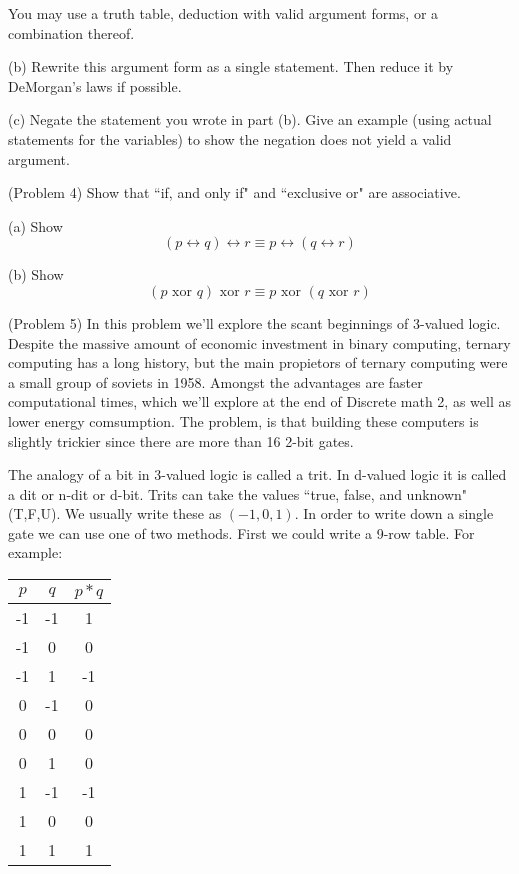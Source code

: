\documentclass[16 pt]{amsart}
\theoremstyle{definition}
\theoremstyle{remark}
\numberwithin{equation}{subsection}
\begin{document}
You may use a truth table, deduction with valid argument forms, or a combination thereof.\\

\vspace{1in}

(b) Rewrite this argument form as a single statement. Then reduce it by DeMorgan's laws if possible.

\vspace{.5in}

(c) Negate the statement you wrote in part (b).  Give an example (using actual statements for the variables) to show the negation does not yield a valid argument.

\newpage

(Problem 4) Show that ``if, and only if" and ``exclusive or" are associative.

(a) Show 
\[
(p\leftrightarrow q)\leftrightarrow r \equiv p\leftrightarrow (q \leftrightarrow r)
\]


(b) Show
\[
(p \text{ xor } q) \text{ xor } r \equiv p \text{ xor } (q \text{ xor } r)
\]

\newpage

(Problem 5) In this problem we'll explore the scant beginnings of 3-valued logic.  Despite the massive amount of economic investment in binary computing, ternary computing has a long history, but the main propietors of ternary computing were a small group of soviets in 1958.\cite{Br}  Amongst the advantages are faster computational times, which we'll explore at the end of Discrete math 2, as well as lower energy comsumption.  The problem, is that building these computers is slightly trickier since there are more than 16 2-bit gates.  
\par The analogy of a bit in 3-valued logic is called a trit.  In d-valued logic it is called a dit or n-dit or d-bit.  Trits can take the values ``true, false, and unknown" (T,F,U).  We usually write these as $(-1,0,1)$.  In order to write down a single gate we can use one of two methods.  First we could write a 9-row table.  For example:
\begin{center}
\begin{tabular}{c | c | c}
$p $& $q$ & $p*q$\\
\hline
-1 & -1 &  1\\
-1 &  0 &  0\\
-1 &  1 & -1\\
0  & -1 &  0\\
0  & 0  & 0 \\
0 & 1 & 0\\
1 & -1 & -1\\
1 & 0 & 0\\
1 & 1 & 1
\end{tabular}
\end{center}
\end{document}
